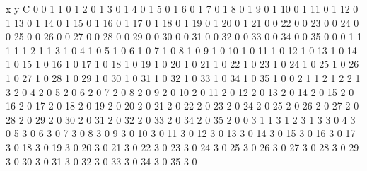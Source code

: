 x y C
0 0 1
1 0 1
2 0 1
3 0 1
4 0 1
5 0 1
6 0 1
7 0 1
8 0 1
9 0 1
10 0 1
11 0 1
12 0 1
13 0 1
14 0 1
15 0 1
16 0 1
17 0 1
18 0 1
19 0 1
20 0 1
21 0 0
22 0 0
23 0 0
24 0 0
25 0 0
26 0 0
27 0 0
28 0 0
29 0 0
30 0 0
31 0 0
32 0 0
33 0 0
34 0 0
35 0 0
0 1 1
1 1 1
2 1 1
3 1 0
4 1 0
5 1 0
6 1 0
7 1 0
8 1 0
9 1 0
10 1 0
11 1 0
12 1 0
13 1 0
14 1 0
15 1 0
16 1 0
17 1 0
18 1 0
19 1 0
20 1 0
21 1 0
22 1 0
23 1 0
24 1 0
25 1 0
26 1 0
27 1 0
28 1 0
29 1 0
30 1 0
31 1 0
32 1 0
33 1 0
34 1 0
35 1 0
0 2 1
1 2 1
2 2 1
3 2 0
4 2 0
5 2 0
6 2 0
7 2 0
8 2 0
9 2 0
10 2 0
11 2 0
12 2 0
13 2 0
14 2 0
15 2 0
16 2 0
17 2 0
18 2 0
19 2 0
20 2 0
21 2 0
22 2 0
23 2 0
24 2 0
25 2 0
26 2 0
27 2 0
28 2 0
29 2 0
30 2 0
31 2 0
32 2 0
33 2 0
34 2 0
35 2 0
0 3 1
1 3 1
2 3 1
3 3 0
4 3 0
5 3 0
6 3 0
7 3 0
8 3 0
9 3 0
10 3 0
11 3 0
12 3 0
13 3 0
14 3 0
15 3 0
16 3 0
17 3 0
18 3 0
19 3 0
20 3 0
21 3 0
22 3 0
23 3 0
24 3 0
25 3 0
26 3 0
27 3 0
28 3 0
29 3 0
30 3 0
31 3 0
32 3 0
33 3 0
34 3 0
35 3 0
